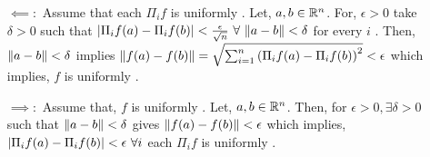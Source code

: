 \begin{soln}{8}
  \begin{itemize}
    \item[$ \impliedby: $]
          Assume that each $ \Pi_i f $ is uniformly \cts. Let, $ a, b \in \mathbb{R}^n $.  For, $ \epsilon > 0 $ take $ \delta >0 $ such that $ \left| {\Pi_i f(a) - \Pi_i f(b)} \right| < \frac{\epsilon}{\sqrt n} \ \forall \ \norm{a-b} < \delta $ for every $ i $ . Then, $ \norm{a-b} < \delta $  implies $ \norm{f(a)-f(b)} = \sqrt{\sum_{i=1}^{n} \left(\Pi_i f(a) - \Pi_i f(b)\right)^2} < \epsilon $ which implies, $ f $ is uniformly \cts.
    \item[$ \implies: $]
          Assume that, $ f $ is uniformly \cts. Let, $ a, b \in \mathbb{R}^n $. Then, for $ \epsilon > 0, \exists \delta >0 $ such that $ \norm{a-b} < \delta $ gives $ \norm{f(a)-f(b)} < \epsilon $ which implies, $ \left| {\Pi_i f(a) - \Pi_i f(b)} \right| < \epsilon \ \forall i $ \thatis each $ \Pi_i f $ is uniformly \cts.
  \end{itemize}
\end{soln}